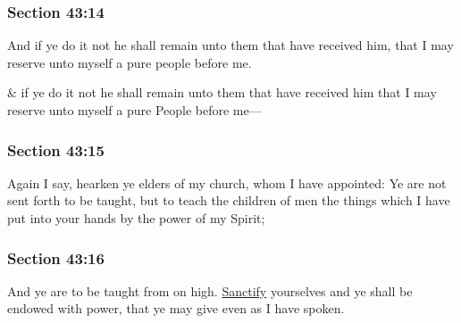 	\subsubsection{Section 43:14} %
		\label{DC43-14}

		And if ye do it not he shall remain unto them that have received him, that I may reserve unto myself a pure people before me.

		\begin{framed}
		\scriptsize
			\begin{compactdesc}
				\item[JSP] \& if ye do it not he shall remain unto them that have received him that I may reserve unto myself a pure People before me---
			\end{compactdesc}
		\end{framed}

	\subsubsection{Section 43:15} %
		\label{DC43-15}

		Again I say, hearken ye elders of my church, whom I have appointed: Ye are not sent forth to be taught, but to teach the children of men the things which I have put into your hands by the power of my Spirit;


	\subsubsection{Section 43:16} %
		\label{DC43-16}

		And ye are to be taught from on high. \hyperref[SANCTIFICATION]{Sanctify} yourselves and ye shall be endowed with power, that ye may give even as I have spoken.


